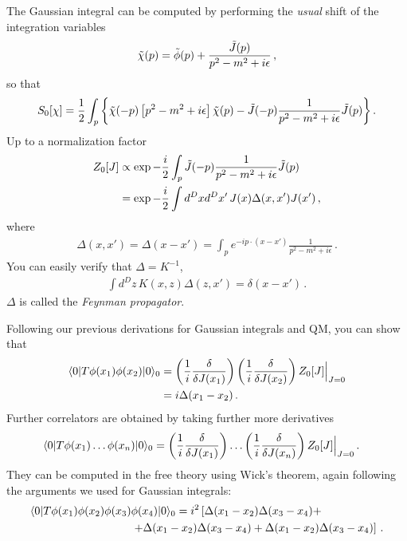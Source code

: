 The Gaussian integral can be computed by performing the {\em usual}
shift of the integration variables
\[
  \tilde{\chi}(p) = \tilde{\phi}(p) + \frac{\tilde{J}(p)}{p^2-m^2+i\epsilon}\, ,
\]
so that
\begin{align}
  S_0[\chi] = 
  \frac12 \int_p \bigg\{
  \tilde{\chi}(-p) \left[p^2-m^2+i\epsilon\right] \tilde{\chi}(p)
  - \tilde{J}(-p) \frac{1}{p^2-m^2+i\epsilon} \tilde{J}(p)
  \bigg\} \,.
\end{align}
Up to a normalization factor
\begin{align}
  Z_0[J] &\propto \exp -\frac{i}{2} \int_p \tilde{J}(-p)
           \frac{1}{p^2-m^2+i\epsilon} \tilde{J}(p) \\
  &= \exp -\frac{i}{2} \int d^Dx d^Dx'\,  J(x) \Delta(x,x') J(x') \, ,
\end{align}
where
\begin{align}
  \Delta(x,x') = \Delta(x-x') = 
  \int_p e^{-i p\cdot (x-x')} \frac{1}{p^2-m^2+i\epsilon}\, .
\end{align}
You can easily verify that $\Delta=K^{-1}$, \ie
\begin{align}
  \int d^Dz \, K(x,z) \Delta(z,x') = \delta(x-x')\, .
\end{align}
$\Delta$ is called the {\em Feynman propagator}.

Following our previous derivations for Gaussian integrals and QM, you
can show that
 \begin{align}
   \langle 0 | T \phi(x_1) \phi(x_2) | 0 \rangle_0 &= 
   \left(\frac{1}{i} \frac{\delta}{\delta J(x_1)}\right)
   \left(\frac{1}{i} \frac{\delta}{\delta J(x_2)}\right)
   Z_0[J]\Big|_{J=0} \\ 
   &= i \Delta(x_1-x_2)\, .
 \end{align}
Further correlators are obtained by taking further more derivatives
\begin{align}
  \langle 0 | T \phi(x_1) \ldots \phi(x_n) | 0 \rangle_0 
  &= 
    \left(\frac{1}{i} \frac{\delta}{\delta J(x_1)}\right)
    \ldots
    \left(\frac{1}{i} \frac{\delta}{\delta J(x_n)}\right)
    Z_0[J]\Big|_{J=0} \, .
\end{align}
They can be computed in the free theory using Wick's theorem, again
following the arguments we used for Gaussian integrals: 
\begin{align}
  \langle 0 | T \phi(x_1) \phi(x_2) \phi(x_3) 
  &\phi(x_4) | 0 \rangle_0 
    = i^2 \left[
    \Delta(x_1-x_2) \Delta(x_3-x_4) + \right. \nonumber \\
  & \left. + \Delta(x_1-x_2) \Delta(x_3-x_4) + 
    \Delta(x_1-x_2) \Delta(x_3-x_4)
    \right]\, .
\end{align}

